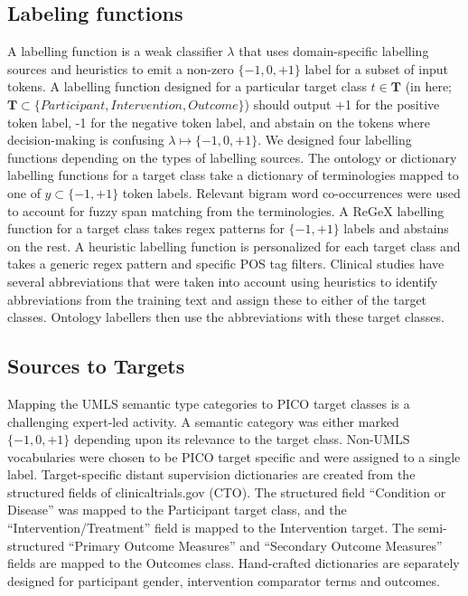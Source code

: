 \documentclass[10.7pt,]{article}
\begin{document}
\subsection{Labeling functions}\label{lfs}
%
A labelling function is a weak classifier $\lambda$ that uses domain-specific labelling sources and heuristics to emit a non-zero $\{-1, 0, +1\}$ label for a subset of input tokens.
A labelling function designed for a particular target class $t \in \bm{T}$ (in here; $\bm{T} \subset \{ Participant, Intervention, Outcome \} $) should output  +1 for the positive token label, -1 for the negative token label, and abstain on the tokens where decision-making is confusing $\lambda \mapsto \{-1, 0, +1\}$.
We designed four labelling functions depending on the types of labelling sources.
The ontology or dictionary labelling functions for a target class take a dictionary of terminologies mapped to one of $y \subset \{-1, +1\} $ token labels.
Relevant bigram word co-occurrences were used to account for fuzzy span matching from the terminologies.
A ReGeX labelling function for a target class takes regex patterns for $\{-1, +1\}$ labels and abstains on the rest.
A heuristic labelling function is personalized for each target class and takes a generic regex pattern and specific POS tag filters.
Clinical studies have several abbreviations that were taken into account using heuristics to identify abbreviations from the training text and assign these to either of the target classes. 
Ontology labellers then use the abbreviations with these target classes.
%
%
%
\subsection{Sources to Targets}\label{lfs}
%
Mapping the UMLS semantic type categories to PICO target classes is a challenging expert-led activity.
A semantic category was either marked $\{-1, 0, +1\}$ depending upon its relevance to the target class.
Non-UMLS vocabularies were chosen to be PICO target specific and were assigned to a single label.
Target-specific distant supervision dictionaries are created from the structured fields of clinicaltrials.gov (CTO). 
The structured field ``Condition or Disease'' was mapped to the Participant target class, and the ``Intervention/Treatment'' field is mapped to the Intervention target.
The semi-structured ``Primary Outcome Measures'' and ``Secondary Outcome Measures'' fields are mapped to the Outcomes class.
Hand-crafted dictionaries are separately designed for participant gender, intervention comparator terms and outcomes.
%
%
%
\end{document}
